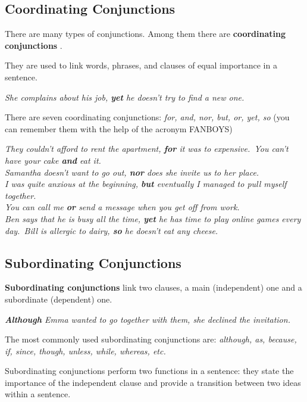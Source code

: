 \documentclass[hidelinks,10pt,a4paper]{article}
\begin{document}
\subsection{Coordinating Conjunctions}
There are many types of conjunctions. Among them there are \textbf{coordinating conjunctions} .

They are used to link words, phrases, and clauses of equal importance in a sentence.

\begin{center}
	\textit{She complains about his job, \textbf{yet} he doesn't try to find a new one.}
\end{center}

There are seven coordinating conjunctions: \textit{for, and, nor, but, or, yet, so} (you can remember them with the help of the acronym FANBOYS)

\begin{center}
	\textit{They couldn't afford to rent the apartment, \textbf{for} it was to expensive.\
	You can't have your cake \textbf{and} eat it.\\
	Samantha doesn't want to go out, \textbf{nor} does she invite us to her place.\\
	I was quite anxious at the beginning, \textbf{but} eventually I managed to pull myself together.\\
	You can call me \textbf{or} send a message when you get off from work.\\
	Ben says that he is busy all the time, \textbf{yet} he has time to play online games every day.\
	Bill is allergic to dairy, \textbf{so} he doesn't eat any cheese.}
\end{center}

\subsection{Subordinating Conjunctions}
\textbf{Subordinating conjunctions} link two clauses, a main (independent) one and a subordinate (dependent) one.

\begin{center}
	\textit{\textbf{Although} Emma wanted to go together with them, she declined the invitation.}
\end{center}

The most commonly used subordinating conjunctions are: \textit{although, as, because, if, since, though, unless, while, whereas, etc.}

Subordinating conjunctions perform two functions in a sentence: they state the importance of the independent clause and provide a transition between two ideas within a sentence.
\end{document}
